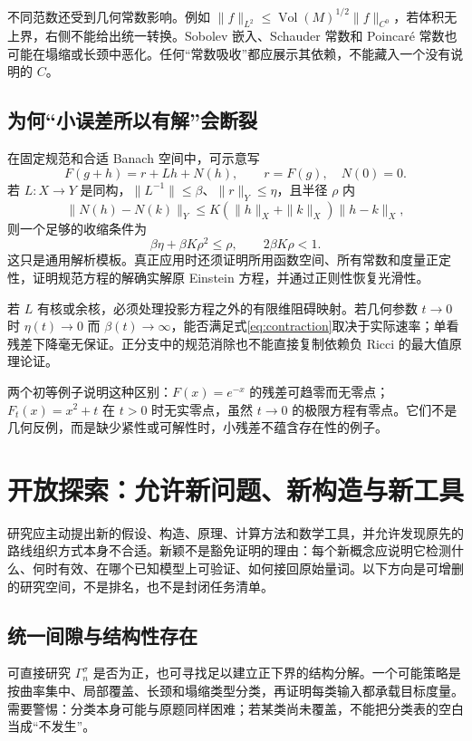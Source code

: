 \documentclass[11pt,a4paper]{article}
\theoremstyle{definition}
\newcommand{\Vol}{\operatorname{Vol}}
\begin{document}
不同范数还受到几何常数影响。例如 $\|f\|_{L^2}\le\Vol(M)^{1/2}\|f\|_{C^0}$，若体积无上界，右侧不能给出统一转换。Sobolev 嵌入、Schauder 常数和 Poincaré 常数也可能在塌缩或长颈中恶化。任何“常数吸收”都应展示其依赖，不能藏入一个没有说明的 $C$。

\subsection{为何“小误差所以有解”会断裂}

在固定规范和合适 Banach 空间中，可示意写
\[
F(g+h)=r+Lh+N(h),\qquad r=F(g),\quad N(0)=0.
\]
若 $L:X\to Y$ 是同构，$\|L^{-1}\|\le\beta$、$\|r\|_Y\le\eta$，且半径 $\rho$ 内
\[
\|N(h)-N(k)\|_Y\le K(\|h\|_X+\|k\|_X)\|h-k\|_X,
\]
则一个足够的收缩条件为
\begin{equation}\label{eq:contraction}
\beta\eta+\beta K\rho^2\le\rho,\qquad2\beta K\rho<1.
\end{equation}
这只是通用解析模板。真正应用时还须证明所用函数空间、所有常数和度量正定性，证明规范方程的解确实解原 Einstein 方程，并通过正则性恢复光滑性。

若 $L$ 有核或余核，必须处理投影方程之外的有限维阻碍映射。若几何参数 $t\to0$ 时 $\eta(t)\to0$ 而 $\beta(t)\to\infty$，能否满足式\eqref{eq:contraction}取决于实际速率；单看残差下降毫无保证。正分支中的规范消除也不能直接复制依赖负 Ricci 的最大值原理论证。

两个初等例子说明这种区别：$F(x)=e^{-x}$ 的残差可趋零而无零点；$F_t(x)=x^2+t$ 在 $t>0$ 时无实零点，虽然 $t\to0$ 的极限方程有零点。它们不是几何反例，而是缺少紧性或可解性时，小残差不蕴含存在性的例子。

\section{开放探索：允许新问题、新构造与新工具}\label{sec:exploration}

研究应主动提出新的假设、构造、原理、计算方法和数学工具，并允许发现原先的路线组织方式本身不合适。新颖不是豁免证明的理由：每个新概念应说明它检测什么、何时有效、在哪个已知模型上可验证、如何接回原始量词。以下方向是可增删的研究空间，不是排名，也不是封闭任务清单。

\subsection{统一间隙与结构性存在}

可直接研究 $\Gamma_n^\sigma$ 是否为正，也可寻找足以建立正下界的结构分解。一个可能策略是按曲率集中、局部覆盖、长颈和塌缩类型分类，再证明每类输入都承载目标度量。需要警惕：分类本身可能与原题同样困难；若某类尚未覆盖，不能把分类表的空白当成“不发生”。
\end{document}
